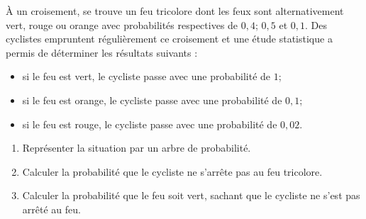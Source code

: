 \documentclass[11pt]{article}
\begin{document}
\begin{exo}[$4$ points]
  À un croisement, se trouve un feu tricolore dont les feux sont alternativement
  vert, rouge ou orange avec probabilités respectives de $0,4$; $0,5$ et $0,1$.
  Des cyclistes empruntent régulièrement ce croisement et une étude statistique
  a permis de déterminer les résultats suivants :
  \begin{itemize}
    \item si le feu est vert, le cycliste passe avec une probabilité de $1$;
    \item si le feu est orange, le cycliste passe avec une probabilité de $0,1$;
    \item si le feu est rouge, le cycliste passe avec une probabilité de $0,02$.
  \end{itemize}
  \begin{enumerate}
    \item Représenter la situation par un arbre de probabilité.
    \item Calculer la probabilité que le cycliste ne s'arrête pas au feu
      tricolore.
    \item Calculer la probabilité que le feu soit vert, sachant que le cycliste
      ne s'est pas arrêté au feu.
  \end{enumerate}
\end{exo}
\end{document}
